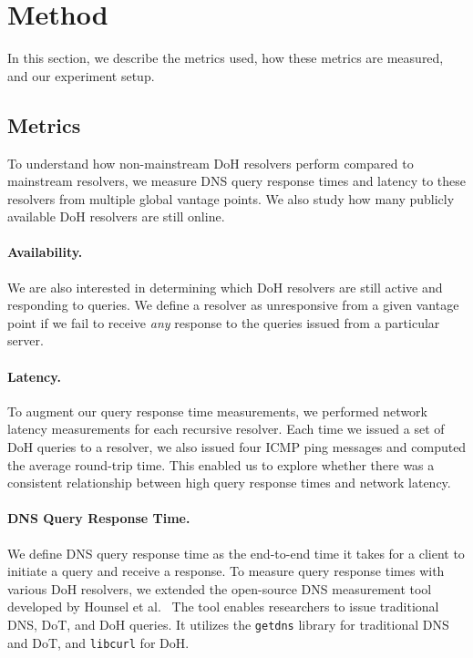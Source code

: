 \section{Method}\label{sec:method} In this section, we describe the metrics
used, how these metrics are measured, and our experiment setup.

\subsection{Metrics} To understand how non-mainstream DoH resolvers perform
compared to mainstream resolvers, we measure DNS query response times and
latency to these resolvers from multiple global vantage points.  We also study
how many publicly available DoH resolvers are still online.

\paragraph{Availability.} We are also interested in determining which DoH
resolvers are still active and responding to queries.  We define a resolver as
unresponsive from a given vantage point if we fail to receive \emph{any}
response to the queries issued from a particular server.

\paragraph{Latency.} To augment our query response time measurements, we
performed network latency measurements for each recursive resolver.  Each time
we issued a set of DoH queries to a resolver, we also issued four ICMP ping
messages and computed the average round-trip time.  This enabled us to explore
whether there was a consistent relationship between high query response times
and network latency.


\paragraph{DNS Query Response Time.} We define DNS query response time as the
end-to-end time it takes for a client to initiate a query and receive a
response.  To measure query response times with various DoH resolvers, we
extended the open-source DNS measurement tool developed by Hounsel et
al.~\cite{hounsel2020comparing} The tool enables researchers to issue
traditional DNS, DoT, and DoH queries.  It utilizes the \texttt{getdns}
library for traditional DNS and DoT, and \texttt{libcurl} for DoH.

